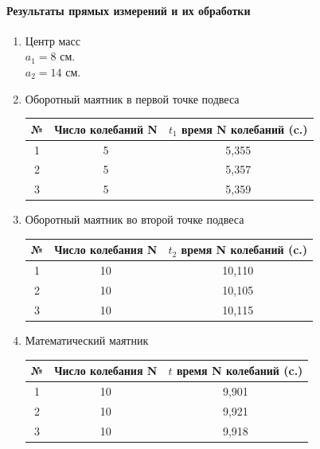 \documentclass{article}
\begin{document}
\paragraph{Результаты прямых измерений и их обработки }
\begin{enumerate}
	\item Центр масс\\
	$ a_1 = 8 $ см.\\
	$ a_2 = 14$ см.
	
\item Оборотный маятник в первой точке подвеса\\
\begin{table}[!h]	
\begin{tabular}{|c|c|c|}
	\hline
	№ & Число колебаний N & $t_1$  время N колебаний (c.) \\
	\hline
	1 & 5 & 5,355 \\
	\hline
	2 & 5 & 5,357 \\
	\hline
	3 & 5 & 5,359 \\
	\hline
\end{tabular}
\end{table}

\item Оборотный маятник во второй точке подвеса

\begin{table}[!h]
\begin{tabular}{|c|c|c|}
		\hline
		№ & Число колебания N & $t_2$  время N колебаний (c.) \\
		\hline
		1 & 10 & 10,110 \\
		\hline
		2 & 10 & 10,105 \\
		\hline
		3 & 10 & 10,115 \\
		\hline
\end{tabular}
\end{table}

\item Математический маятник

\begin{table}[!hpb]
	\begin{tabular}{|c|c|c|}
		\hline
		№ & Число колебания N & $t$  время N колебаний (c.) \\
		\hline
		1 & 10 &  9,901\\
		\hline
		2 & 10 & 9,921 \\
		\hline
		3 & 10 & 9,918 \\
		\hline
	\end{tabular}
\end{table}
\end{enumerate}
\end{document}
